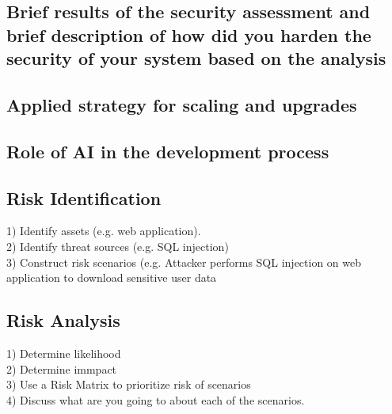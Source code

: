 \documentclass[11pt]{article}
\begin{document}
\subsection{Brief results of the security assessment and brief description of how did you harden the security of your system based on the analysis}
\subsection{Applied strategy for scaling and upgrades}

\subsection{Role of AI in the development process}

\subsection{Risk Identification}
1) Identify assets (e.g. web application).\\
2) Identify threat sources (e.g. SQL injection) \\
3) Construct risk scenarios (e.g. Attacker performs SQL injection on web application to download sensitive user data

\subsection{Risk Analysis}
1) Determine likelihood \\
2) Determine immpact \\
3) Use a Risk Matrix to prioritize risk of scenarios \\
4) Discuss what are you going to about each of the scenarios.  
\end{document}
